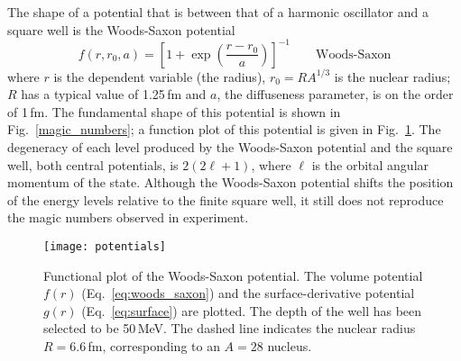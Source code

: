 The shape of a potential that is between that of a harmonic oscillator and a square well is the Woods-Saxon potential
\begin{equation}
f(r,r_0,a)=\left[1+\exp \left(\frac{r-r_0}{a}\right)\right]^{-1} \qquad \textrm{Woods-Saxon}
\label{eq:woods_saxon}
\end{equation}
where $r$ is the dependent variable (the radius), $r_0=RA^{1/3}$ is the nuclear radius; $R$ has a typical value of 1.25\,fm and $a$, the diffuseness parameter, is on the order of 1\,fm. 
The fundamental shape of this potential is shown in Fig.~\ref{magic_numbers}; a function plot of this potential is given in Fig.~\ref{potentials}.  The degeneracy of each level produced by the Woods-Saxon potential and the square well, both central potentials, is $2(2\ell+1)$, where $\ell$ is the orbital angular momentum of the state.  Although the Woods-Saxon potential shifts the position of the energy levels relative to the finite square well, it still does not reproduce the magic numbers observed in experiment.

\begin{figure}%
\centering
\texttt{[image: potentials]}%
\caption[Functional plot of the Woods-Saxon potential]{Functional plot of the Woods-Saxon potential.  The volume potential $f(r)$ (Eq.~\ref{eq:woods_saxon}) and the surface-derivative potential $g(r)$ (Eq.~\ref{eq:surface}) are plotted.  The depth of the well has been selected to be 50\,MeV.  The dashed line indicates the nuclear radius $R=6.6$\,fm, corresponding to an $A=28$ nucleus.}%
\label{potentials}%
\end{figure}

